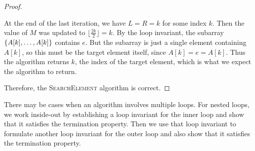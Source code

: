 \begin{example}
\begin{proof}
\begin{enumerate}
                At the end of the last iteration, we have $L = R = k$ for some index $k$. Then the value of $M$ was updated to $\lfloor\frac{2k}{2}\rfloor = k$. By the loop invariant, the subarray $\left\{A[k],\ldots,A[k]\right\}$ contains $e$. But the subarray is just a single element containing $A[k]$, so this must be the target element itself, since $A[k] = e = A[k]$. Thus the algorithm returns $k$, the index of the target element, which is what we expect the algorithm to return.
        \end{enumerate}

        Therefore, the \textsc{SearchElement} algorithm is correct.
    \end{proof}
\end{example}

There may be cases when an algorithm involves multiple loops. For nested loops, we work inside-out by establishing a loop invariant for the inner loop and show that it satisfies the termination property. Then we use that loop invariant to formulate another loop invariant for the outer loop and also show that it satisfies the termination property.

